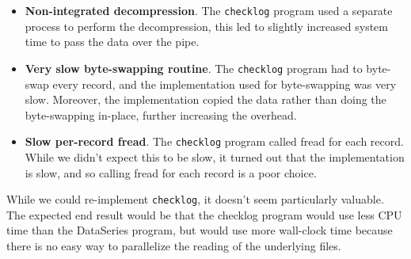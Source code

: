 \begin{itemize}

\item {\bf Non-integrated decompression}.  The {\tt checklog} program 
used a separate process to perform the decompression, this led to
slightly increased system time to pass the data over the pipe.

\item {\bf Very slow byte-swapping routine}.  The {\tt checklog} program
had to byte-swap every record, and the implementation used for
byte-swapping was very slow.  Moreover, the implementation copied the
data rather than doing the byte-swapping in-place, further increasing
the overhead.

\item {\bf Slow per-record fread}.  The {\tt checklog} program called 
fread for each record.  While we didn't expect this to be slow, it
turned out that the implementation is slow, and so calling fread for
each record is a poor choice.

\end{itemize}

While we could re-implement {\tt checklog}, it doesn't seem
particularly valuable.  The expected end result would be that the
checklog program would use less CPU time than the DataSeries program,
but would use more wall-clock time because there is no easy way to
parallelize the reading of the underlying files.

